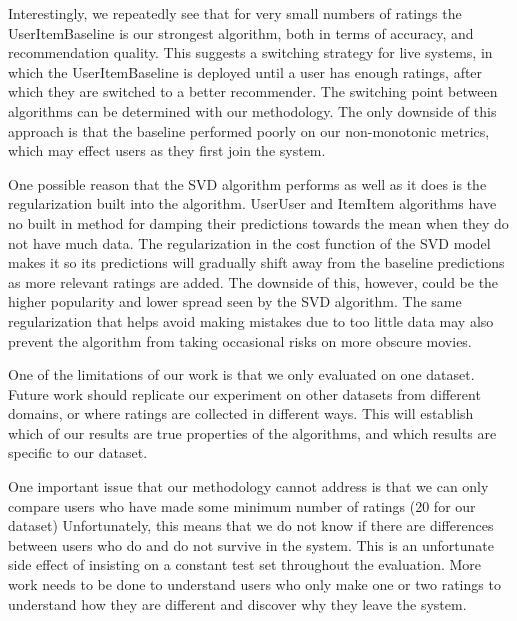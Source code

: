 \documentclass[letterpaper]{sig-alternate}
\begin{document}
  Interestingly, we repeatedly see that for very small numbers of ratings the UserItemBaseline is our strongest algorithm, both in terms of accuracy, and recommendation quality.
  This suggests a switching strategy for live systems, in which the UserItemBaseline is deployed until a user has enough ratings, after which they are switched to a better recommender.
  The switching point between algorithms can be determined with our methodology.
  The only downside of this approach is that the baseline performed poorly on our non-monotonic metrics, which may effect users as they first join the system.
  

  One possible reason that the SVD algorithm performs as well as it does is the regularization built into the algorithm.
  UserUser and ItemItem algorithms have no built in method for damping their predictions towards the mean when they do not have much data.
  The regularization in the cost function of the SVD model makes it so its predictions will gradually shift away from the baseline predictions as more relevant ratings are added.
  The downside of this, however, could be the higher popularity and lower spread seen by the SVD algorithm.
  The same regularization that helps avoid making mistakes due to too little data may also prevent the algorithm from taking occasional risks on more obscure movies.
  


  One of the limitations of our work is that we only evaluated on one dataset.
  Future work should replicate our experiment on other datasets from different domains, or where ratings are collected in different ways.
  This will establish which of our results are true properties of the algorithms, and which results are specific to our dataset.

  One important issue that our methodology cannot address is that we can only compare users who have made some minimum number of ratings (20 for our dataset)
  Unfortunately, this means that we do not know if there are differences between users who do and do not survive in the system.
  This is an unfortunate side effect of insisting on a constant test set throughout the evaluation.
  More work needs to be done to understand users who only make one or two ratings to understand how they are different and discover why they leave the system.
\end{document}
